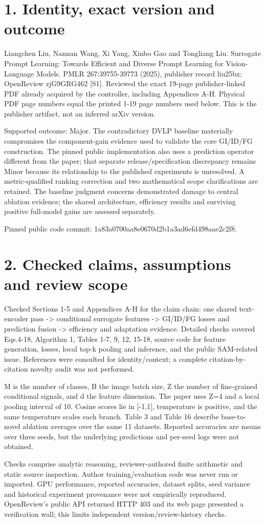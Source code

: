 \documentclass[10pt]{article}
\begin{document}
\section*{1. Identity, exact version and outcome}
Liangchen Liu, Nannan Wang, Xi Yang, Xinbo Gao and Tongliang Liu. Surrogate Prompt Learning: Towards Efficient and Diverse Prompt Learning for Vision-Language Models. PMLR 267:39755-39773 (2025), publisher record liu25bx; OpenReview zjG9GRG462 [S1]. Reviewed the exact 19-page publisher-linked PDF already acquired by the controller, including Appendices A-H. Physical PDF page numbers equal the printed 1-19 page numbers used below. This is the publisher artifact, not an inferred arXiv version.\par
Supported outcome: Major. The contradictory DVLP baseline materially compromises the component-gain evidence used to validate the core GI/ID/FG construction. The pinned public implementation also uses a prediction operator different from the paper; that separate release/specification discrepancy remains Minor because its relationship to the published experiments is unresolved. A metric-qualified ranking correction and two mathematical scope clarifications are retained. The baseline judgment concerns demonstrated damage to central ablation evidence; the shared architecture, efficiency results and surviving positive full-model gains are assessed separately.\par
Pinned public code commit: 1a83a0700aa8e0670d2b1a3ad6efd498aae2c2f8.\par
\section*{2. Checked claims, assumptions and review scope}
Checked Sections 1-5 and Appendices A-H for the claim chain: one shared text-encoder pass -> conditional surrogate features -> GI/ID/FG losses and prediction fusion -> efficiency and adaptation evidence. Detailed checks covered Eqs.4-18, Algorithm 1, Tables 1-7, 9, 12, 15-18, source code for feature generation, losses, local top-k pooling and inference, and the public SAM-related issue. References were consulted for identity/context; a complete citation-by-citation novelty audit was not performed.\par
M is the number of classes, B the image batch size, Z the number of fine-grained conditional signals, and d the feature dimension. The paper uses Z=4 and a local pooling interval of 10. Cosine scores lie in [-1,1], temperature is positive, and the same temperature scales each branch. Table 3 and Table 16 describe base-to-novel ablation averages over the same 11 datasets. Reported accuracies are means over three seeds, but the underlying predictions and per-seed logs were not obtained.\par
Checks comprise analytic reasoning, reviewer-authored finite arithmetic and static source inspection. Author training/evaluation code was never run or imported. GPU performance, reported accuracies, dataset splits, seed variance and historical experiment provenance were not empirically reproduced. OpenReview’s public API returned HTTP 403 and its web page presented a verification wall; this limits independent version/review-history checks.\par
\end{document}
